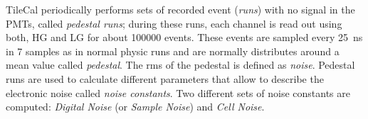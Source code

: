 TileCal periodically performs sets of recorded event (\emph{runs}) with no
signal in the PMTs, called \emph{pedestal runs}; during these runs, each channel
is read out using both, HG and LG for about 100000 events. These events are
sampled every 25~ns in 7 samples as in normal physic runs and are normally
distributes around a mean value called \emph{pedestal}. The \gls{rms} of the
pedestal is defined as \emph{noise}. Pedestal runs are used to calculate
different parameters that allow to describe the electronic noise called
\emph{noise constants}. Two different sets of noise constants are computed:
\emph{Digital Noise} (or \emph{Sample Noise}) and \emph{Cell Noise}.
